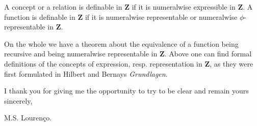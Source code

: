 \documentclass[12pt]{article}
\begin{document}
A concept or a relation is definable in $\textbf{Z}$ if it is numeralwise expressible in $\textbf{Z}$. A function is definable in $\textbf{Z}$ if it is numeralwise representable or numeralwise $\phi$-representable in $\textbf{Z}$.

On the whole we have a theorem about the equivalence of a function being recursive and being numeralwise representable in $\textbf{Z}$. Above one can find formal definitions of the concepts of expression, resp. representation in $\textbf{Z}$, as they were first formulated in Hilbert and Bernays \emph{Grundlagen}.

I thank you for giving me the opportunity to try to be clear
and remain yours sincerely,

M.S. Louren\c{c}o.
\end{document}
